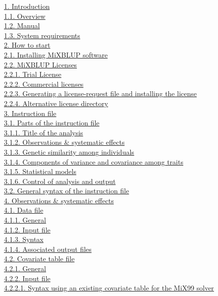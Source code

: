 \hyperref[Intr01]{1. Introduction}\\
\hyperref[Intr02]{1.1. Overview}\\
\hyperref[Intr03]{1.2. Manual}\\
\hyperref[Intr04]{1.3. System requirements}\\
\hyperref[HowT01]{2. How to start}\\
\hyperref[HowT02]{2.1. Installing MiXBLUP software}\\
\hyperref[HowT03]{2.2. MiXBLUP Licenses}\\
\hyperref[HowT04]{2.2.1. Trial License}\\
\hyperref[HowT05]{2.2.2. Commercial licenses}\\
\hyperref[HowT06]{2.2.3. Generating a license-request file and
installing the license}\\
\hyperref[HowT07]{2.2.4. Alternative license directory}\\
\hyperref[Inst01]{3. Instruction file}\\
\hyperref[Inst02]{3.1. Parts of the instruction file}\\
\hyperref[Inst03]{3.1.1. Title of the analysis}\\
\hyperref[Inst04]{3.1.2. Observations \& systematic effects}\\
\hyperref[Inst05]{3.1.3. Genetic similarity among individuals}\\
\hyperref[Inst06]{3.1.4. Components of variance and covariance among
traits}\\
\hyperref[Inst07]{3.1.5. Statistical models}\\
\hyperref[Inst08]{3.1.6. Control of analysis and output}\\
\hyperref[Inst09]{3.2. General syntax of the instruction file}\\
\hyperref[Obse01]{4. Observations \& systematic effects}\\
\hyperref[Obse02]{4.1. Data file}\\
\hyperref[Obse03]{4.1.1. General}\\
\hyperref[Obse04]{4.1.2. Input file}\\
\hyperref[Obse05]{4.1.3. Syntax}\\
\hyperref[Obse06]{4.1.4. Associated output files}\\
\hyperref[Obse07]{4.2. Covariate table file}\\
\hyperref[Obse08]{4.2.1. General}\\
\hyperref[Obse09]{4.2.2. Input file}\\
\hyperref[Obse10]{4.2.2.1. Syntax using an existing covariate table for
the MiX99 solver}\\
